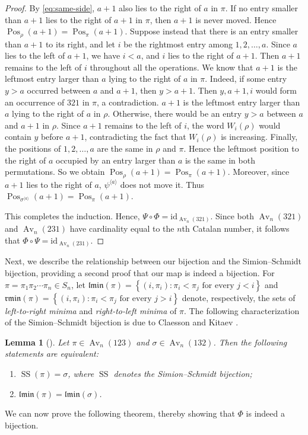 \documentclass[11pt]{article}
\newtheorem{lem}[thm]{Lemma}
\begin{document}
\begin{proof}
By \eqref{eq:same-side}, $a+1$ also lies to the right of $a$ in $\pi$.
If no entry smaller than $a+1$ lies to the right of $a+1$ in $\pi$, then
$a+1$ is never moved. Hence
$\operatorname{Pos}_{\rho}(a+1)
=
\operatorname{Pos}_{\pi}(a+1)$.
Suppose instead that there is an entry smaller than $a+1$ to its right,
and let $i$ be the rightmost entry among $1,2,\ldots,a$. Since $a$
lies to the left of $a+1$, we have $i<a$, and $i$ lies to the right of
$a+1$. Then $a+1$ remains to the left of $i$ throughout all the operations.
We know that $a+1$ is the leftmost entry larger than $a$ lying to the
right of $a$ in $\pi$. Indeed, if some entry $y>a$ occurred between
$a$ and $a+1$, then $y>a+1$. Then $y,a+1,i$ would
form an occurrence of $321$ in $\pi$, a contradiction.
$a+1$ is the leftmost entry larger than $a$ lying to the
right of $a$ in $\rho$. Otherwise, there would be an entry
$y>a$ between $a$ and $a+1$ in $\rho$. Since $a+1$ remains to the left
of $i$, the word $W_i(\rho)$ would contain $y$ before $a+1$,
contradicting the fact that $W_i(\rho)$ is increasing.
Finally, the positions of $1,2,\ldots,a$ are the same in $\rho$ and
$\pi$. Hence the leftmost position to the right of $a$ occupied by an
entry larger than $a$ is the same in both permutations. 
So we obtain
$
\operatorname{Pos}_{\rho}(a+1)
=
\operatorname{Pos}_{\pi}(a+1).
$
Moreover, since $a+1$ lies to the right of $a$,
$\psi^{\langle a\rangle}$ does not move it. Thus
$
\operatorname{Pos}_{\sigma^{\langle a\rangle}}(a+1)
=
\operatorname{Pos}_{\pi}(a+1).
$

This completes the induction. Hence,
$\Psi\circ\Phi
=
\mathrm{id}_{\operatorname{Av}_n(321)}$.
Since both $\operatorname{Av}_n(321)$ and
$\operatorname{Av}_n(231)$ have cardinality equal to the $n$th
Catalan number, it follows that
$\Phi\circ\Psi
=
\mathrm{id}_{\operatorname{Av}_n(231)}$.
\end{proof}

Next, we describe the relationship between our bijection and the
Simion--Schmidt bijection, providing a second proof that our map is indeed
a bijection. For $\pi=\pi_1\pi_2\cdots\pi_n\in S_n$, let
$\mathfrak{lmin}(\pi)
=
\left\{
(i,\pi_i):
\pi_i<\pi_j\text{ for every }j<i
\right\}$
and
$\mathfrak{rmin}(\pi)
=
\left\{
(i,\pi_i):
\pi_i<\pi_j\text{ for every }j>i
\right\}$
denote, respectively, the sets of {\em left-to-right minima} and
{\em right-to-left minima} of $\pi$. The following characterization of the Simion--Schmidt bijection is due
to Claesson and Kitaev \cite{ClaessonKitaev2008}.

\begin{lem}[{\cite[Lemma 6]{ClaessonKitaev2008}}]
\label{lem:Simion--Schmidt-lmin}
Let $\pi\in\operatorname{Av}_n(123)$ and
$\sigma\in\operatorname{Av}_n(132)$. Then the following statements
are equivalent:
\begin{enumerate}
    \item $\operatorname{SS}(\pi)=\sigma$, where
    $\operatorname{SS}$ denotes the Simion--Schmidt bijection;
    \item $\mathfrak{lmin}(\pi)=\mathfrak{lmin}(\sigma)$.
\end{enumerate}
\end{lem}
We can now prove the following theorem, thereby showing that $\Phi$ is indeed a bijection.
\end{document}
